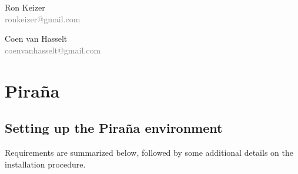 \documentclass[a4,11pt]{report} \usepackage[pdftex]{graphicx}
\begin{document}
\vspace{15pt}

\noindent Ron Keizer\\ \scriptsize{\textcolor{Grey}{ronkeizer@gmail.com}} \normalsize

\noindent Coen van Hasselt\\ \scriptsize{\textcolor{Grey}{coenvanhasselt@gmail.com}} \normalsize

\pagebreak
\chapter{Pira\~na}
\section{Setting up the Pira\~na environment} Requirements are
summarized below, followed by some additional details on the
installation procedure.
\end{document}
